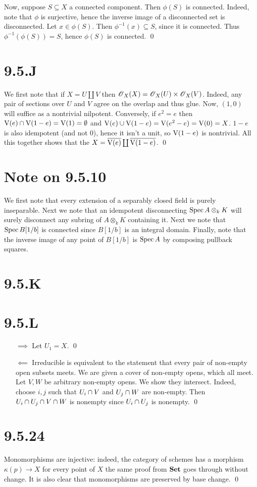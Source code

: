 \documentclass{article}
\begin{document}
Now, suppose $S \subseteq X$ a connected component. Then
$\phi(S)$ is connected. Indeed, note that $\phi$
is surjective, hence the inverse image of a disconnected set is disconnected.
Let $x \in \phi(S)$. Then $\phi^{-1}(x) \subseteq S$, since it is
connected. Thus $\phi^{-1}(\phi(S)) = S$, hence $\phi(S)$ is
connected. \qed

\section{9.5.J}
We first note that if $X=U \coprod V$ then $\operatorname{\mathscr{O}}_X(X)=\operatorname{\mathscr{O}}_X(U) \times \operatorname{\mathscr{O}}_X(V)$.
Indeed, any pair of sections over $U$ and
$V$ agree on the overlap and thus glue. Now,
$(1,0)$ will suffice as a nontrivial nilpotent. Conversely, if
$e^2=e$ then $\operatorname{V}(e) \cap \operatorname{V}(1-e)
    =\operatorname{V}(1)= \emptyset$ and
$\operatorname{V}(e) \cup
    \operatorname{V}(1-e)=\operatorname{V}(e^2-e)=\operatorname{V}(0)=X$. $1-e$ is also idempotent (and not
0), hence it isn't a unit, so $\operatorname{V}(1-e)$ is nontrivial. All this
together shows that the $X=\overline{\operatorname{V}(e)} \coprod \overline{\operatorname{V}(1-e)}$. \qed

\section{Note on 9.5.10}
We first note that every extension of a separably closed field is purely
inseparable. Next we note that an idempotent disconnecting
$\operatorname{Spec} A \otimes_k K$ will surely disconnect any subring of
$A \otimes_k K$ containing it. Next we note that
$\operatorname{Spec} B[1/b]$ is connected since $B[1/b]$ is an
integral domain. Finally, note that the inverse image of any point of
$B[1/b]$ is $\operatorname{Spec} A$ by composing pullback
squares.

\section{9.5.K}

\section{9.5.L}
\begin{itemize}
    \item[$\implies$] Let $U_1=X$. \qed
    \item[$\impliedby$] Irreducible is equivalent to the statement that every
          pair of non-empty open subsets meets. We are given a cover of non-empty opens,
          which all meet. Let $V, W$ be arbitrary non-empty opens. We
          show they intersect. Indeed, choose $i, j$ such that
          $U_i \cap V$ and $U_j \cap W$ are non-empty. Then
          $U_i \cap U_j \cap V \cap W$ is nonempty since $U_i \cap U_j$ is nonempty.
          \qed
\end{itemize}

\section{9.5.24}
Monomorphisms are injective: indeed, the category of schemes has a morphism
$\kappa(p) \to X$ for every point of $X$ the same
proof from $\mathbf{Set}$ goes through without change. It is also
clear that monomorphisms are preserved by base change. \qed
\end{document}
